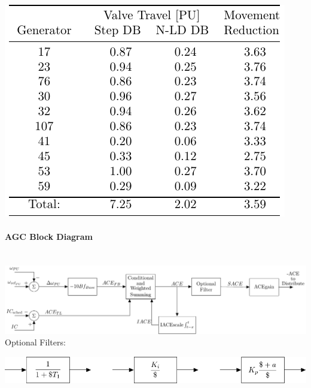 \documentclass[12pt]{article}
\begin{document}
\begin{multicols}{2}
\includegraphics[width=.9\linewidth]{miniWECCnoiseRes01}

\vfill\null
\end{multicols}
\paragraph{AGC Block Diagram} \ \\

\includegraphics[width=\linewidth]{AGC-TLB}\\
Optional Filters:\\
\begin{center}
\includegraphics[width=.8\linewidth]{filterAgent}
\end{center}
\end{document}
